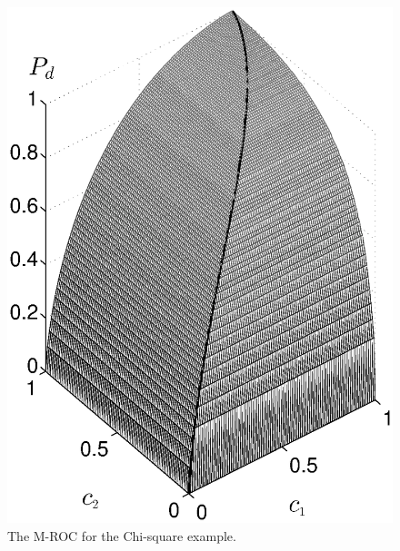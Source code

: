 \documentclass[12pt,journal,a4paper,twoside,onecolumn]{IEEEtran}
\begin{document}
\begin{spacing}{2.5}
\begin{figure}[!t]
\centering
\includegraphics[width=12cm]{simu_chi2ROC.eps}
\caption{The M-ROC for the Chi-square example.}
\label{pic: LJS for chisquare}
\end{figure}



\end{spacing}
\end{document}
